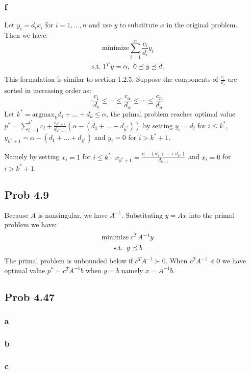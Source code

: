 \documentclass[10pt,a4paper]{article}
\begin{document}
\subsubsection{f}
Let $y_i=d_ix_i$ for $i=1,\dots,n$ and use $y$ to substitute
$x$ in the original problem. Then we have:
$$
\text{minimize} \sum_{i=1}^n \frac{c_i}{d_i}y_i
$$
$$
\text{s.t.\;} 1^Ty=\alpha\text{,\;\;} 0\preceq y \preceq d.
$$
This formulation is similar to section 1.2.5. Suppose the
components of $\frac{c_i}{d_i}$ are sorted in increasing
order as:
$$
\frac{c_1}{d_1}\leq \dotsb \leq \frac{c_\alpha}{d_\alpha} \leq \dotsb \leq\frac{c_n}{d_n} 
$$
Let $k^*=\text{argmax}_kd_1+\dots+d_k\leq \alpha$, the primal problem reaches
optimal value
$p^*=\sum_{i=1}^{k^*}c_i+\frac{c_{k^*+1}}{d_{k^*+1}}(\alpha-(d_1+\dots+d_{k^*}))$
by setting $y_i=d_i$ for $i\leq k^*$, $y_{k^*+1}=\alpha-(d_1+\dots+d_{k^*})$ and
$y_i=0$ for $i>k^*+1$.

Namely by setting $x_i=1$ for $i\leq k^*$, $x_{k^*+1}=\frac{\alpha-(d_1+\dots+d_{k^*})}{d_{k+1}}$ and
$x_i=0$ for $i>k^*+1$.


\subsection{Prob 4.9}
Because $A$ is nonsingular, we have $A^{-1}$. Substituting
$y=Ax$ into the primal problem we have:
$$
\text{minimize\;} c^TA^{-1}y
$$
$$
\text{s.t.\;\;} y\preceq b
$$
The primal problem is unbounded below if $c^TA^{-1}\succ0$.
When $c^TA^{-1}\preceq 0$ we have optimal value
$p^*=c^TA^{-1}b$ when $y=b$ namely $x=A^{-1}b$.

\subsection{Prob 4.47}

\subsubsection{a}



\subsubsection{b}



\subsubsection{c}
\end{document}
